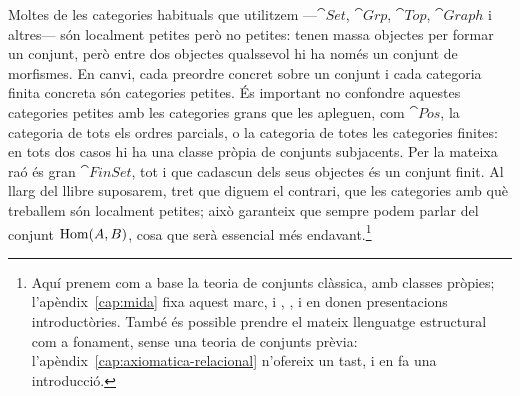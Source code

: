 Moltes de les categories habituals que utilitzem ---$\cat{Set}$, $\cat{Grp}$, $\cat{Top}$, $\cat{Graph}$ i altres--- són localment petites però no petites: tenen massa objectes per formar un conjunt, però entre dos objectes qualssevol hi ha només un conjunt de morfismes. En canvi, cada preordre concret sobre un conjunt i cada categoria finita concreta són categories petites. És important no confondre aquestes categories petites amb les categories grans que les apleguen, com $\cat{Pos}$, la categoria de tots els ordres parcials, o la categoria de totes les categories finites: en tots dos casos hi ha una classe pròpia de conjunts subjacents. Per la mateixa raó és gran $\cat{FinSet}$, tot i que cadascun dels seus objectes és un conjunt finit. Al llarg del llibre suposarem, tret que diguem el contrari, que les categories amb què treballem són localment petites; això garanteix que sempre podem parlar del conjunt $\operatorname{Hom}(A,B)$, cosa que serà essencial més endavant.\footnote{Aquí prenem com a base la teoria de conjunts clàssica, amb classes pròpies; l'apèndix~\ref{cap:mida} fixa aquest marc, i \cite[§1.8]{awodey}, \cite[§1.1]{riehl}, \cite[§3.2]{leinster} i \cite[cap.~1]{perrone} en donen presentacions introductòries. També és possible prendre el mateix llenguatge estructural com a fonament, sense una teoria de conjunts prèvia: l'apèndix~\ref{cap:axiomatica-relacional} n'ofereix un tast, i \cite[cap.~3]{leinster} en fa una introducció.}

